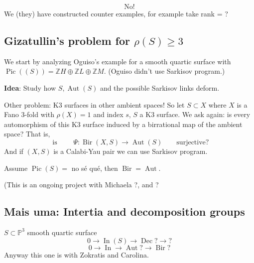 \[\text{No!} \]
We (they) have constructed counter examples, for example take rank = ?

\subsection{Gizatullin's problem for \(\rho(S) \geq 3\)}

We start by analyzing Oguiso's example for a smooth quartic surface with \(\operatorname{Pic}((S))=\mathbb{Z}H \oplus  \mathbb{Z}L \oplus  \mathbb{Z}M\). (Oguiso didn't use Sarkisov program.)

\textbf{Idea}: Study how \(S, \operatorname{Aut}(S)\) and the possible Sarkisov links deform.

Other problem: K3 surfaces in other ambient spaces! So let \(S \subset X\) where \(X\) is a Fano 3-fold with \(\rho(X)=1\) and index \(s\), \(S\) a K3 surface. We ask again: is every automorphism of this K3 surface induced by a birrational map of the ambient space? That is,
\[\text{ is } \qquad \Psi:\operatorname{Bir}(X,S) \longrightarrow \operatorname{Aut}(S)\qquad \text{surjective?} \]
And if \((X,S)\) is a Calabi-Yau pair we can use Sarkisov program.

\begin{prop}\leavevmode
Assume \(\operatorname{Pic}(S) = \) no sé qué, then \(\operatorname{Bir}=\operatorname{Aut}\).
\end{prop}
(This is an ongoing project with Michaela ?, and ?

\subsection{Mais uma: Intertia and decomposition groups}
\(S \subset \mathbb{P}^3\) smooth quartic surface
\[0 \to \operatorname{ I n}(S) \to \operatorname{ D e c}? \to ?\]
\[0 \to \operatorname{ I n} \to \operatorname{Aut}? \to \operatorname{Bir}?\]
Anyway this one is with Zokratis and Carolina.


